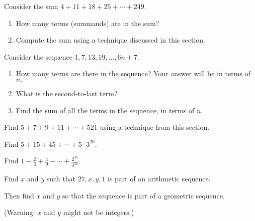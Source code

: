 \documentclass[11pt,]{book}
\theoremstyle{ptxplainnotitle}
\theoremstyle{ptxplaintitle}
\theoremstyle{ptxdefinitionnotitle}
\theoremstyle{ptxdefinitiontitle}
\theoremstyle{ptxdefinitionnotitle}
\theoremstyle{ptxdefinitiontitle}
\theoremstyle{ptxdefinitionnotitle}
\theoremstyle{ptxdefinitiontitle}
\theoremstyle{ptxdefinitiontitlenonumber}
\theoremstyle{ptxdefinitiontitlenonumber}
\numberwithin{equation}{chapter}
\begin{document}
\begin{divisionexercise}{3}\hypertarget{exercise-15}{}
\hypertarget{p-264}{}%
Consider the sum \(4 + 11 + 18 + 25 + \cdots + 249\text{.}\)%
\par
\hypertarget{p-265}{}%
\leavevmode%
\begin{enumerate}[label=\alph*.]
\item\hypertarget{li-155}{}\hypertarget{p-266}{}%
How many terms (summands) are in the sum?%
\item\hypertarget{li-156}{}\hypertarget{p-268}{}%
Compute the sum using a technique discussed in this section.%
\end{enumerate}
%
\end{divisionexercise}%
\begin{divisionexercise}{4}\hypertarget{exercise-16}{}
\hypertarget{p-282}{}%
Consider the sequence \(1, 7, 13, 19, \ldots, 6n + 7\text{.}\)%
\par
\hypertarget{p-283}{}%
\leavevmode%
\begin{enumerate}[label=\alph*.]
\item\hypertarget{li-165}{}\hypertarget{p-284}{}%
How many terms are there in the sequence?  Your answer will be in terms of \(n\text{.}\)%
\item\hypertarget{li-166}{}\hypertarget{p-286}{}%
What is the second-to-last term?%
\item\hypertarget{li-167}{}\hypertarget{p-288}{}%
Find the sum of all the terms in the sequence, in terms of \(n\text{.}\)%
\end{enumerate}
%
\end{divisionexercise}%
\begin{divisionexercise}{5}\hypertarget{exercise-17}{}
\hypertarget{p-297}{}%
Find \(5 + 7 + 9 + 11+ \cdots + 521\) using a technique from this section.%
\end{divisionexercise}%
\begin{divisionexercise}{6}\hypertarget{exercise-18}{}
\hypertarget{p-303}{}%
Find \(5 + 15 + 45 + \cdots + 5\cdot 3^{20}\text{.}\)%
\end{divisionexercise}%
\begin{divisionexercise}{7}\hypertarget{exercise-19}{}
\hypertarget{p-309}{}%
Find \(1 - \frac{2}{3} + \frac{4}{9} - \cdots + \frac{2^{30}}{3^{30}}\text{.}\)%
\end{divisionexercise}%
\begin{divisionexercise}{8}\hypertarget{exercise-20}{}
\hypertarget{p-316}{}%
Find \(x\) and \(y\) such that \(27, x, y, 1\) is part of an arithmetic sequence.%
\par
\hypertarget{p-317}{}%
Then find \(x\) and \(y\) so that the sequence is part of a geometric sequence.%
\par
\hypertarget{p-318}{}%
(Warning: \(x\) and \(y\) might not be integers.)%
\end{divisionexercise}%
\end{document}
